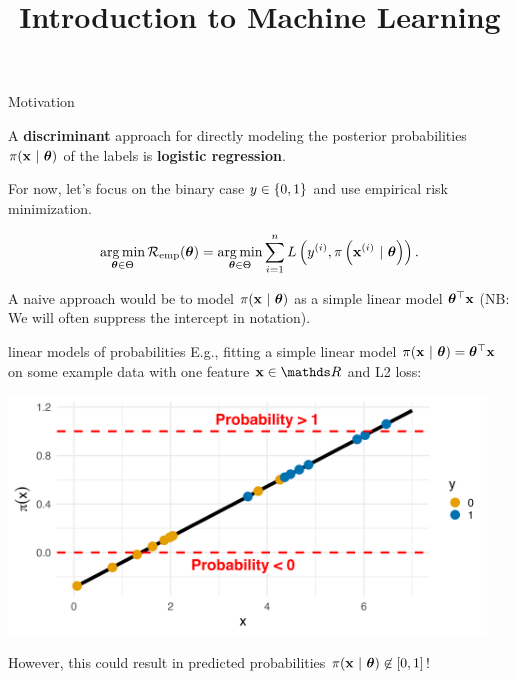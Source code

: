 \documentclass[11pt,compress,t,notes=noshow, xcolor=table]{beamer}
\title{Introduction to Machine Learning}
\begin{document}

\framebreak


\begin{vbframe}{Motivation}

A \textbf{discriminant} approach for directly modeling the posterior probabilities $\pi(\mathbf{x}~|~ \bm{\theta})$ of the labels is \textbf{logistic regression}. 

For now, let's focus on the binary case $y \in \{0, 1\}$ and use empirical risk minimization.
  
$$ \operatorname*{arg\,min}_{\bm{\theta} \in \Theta} \mathcal{R}_{\text{emp}}(\bm{\theta}) = \operatorname*{arg\,min}_{\bm{\theta} \in \Theta} \sum\limits_{i=1}^n L\left(y^{(i)}, \pi\left(\mathbf{x}^{(i)} ~|~ \bm{\theta}\right)\right).$$

\lz
A naive approach would be to model $\pi(\mathbf{x}~|~ \bm{\theta})$ as a simple linear model $\bm{\theta}^\top \mathbf{x}$ 
(NB: We will often suppress the intercept in notation).

\end{vbframe}

\begin{vbframe}{linear models of probabilities}
E.g., fitting a simple linear model $\pi(\mathbf{x}~|~ \bm{\theta}) = \bm{\theta}^\top \mathbf{x}$ on some example data with one feature $\xv \in \R$ and L2 loss:

\lz 

{\centering \includegraphics[width=0.95\textwidth]{figure/preds_with_probs-linear.png}
}

However, this could result in predicted probabilities $\pi(\mathbf{x}~|~ \bm{\theta}) \not\in [0,1]$!

\end{vbframe}
\end{document}
